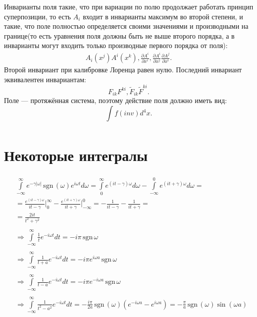 \documentclass[a4paper,14pt]{extreport} %
\newcommand{\dff}[2]{\frac{\partial #1}{\partial #2}}
\newcommand{\sign}{\mathrm{\,sgn}\,}
\begin{document}
	 Инварианты поля такие, что при вариации по полю продолжает работать принцип суперпозиции, то есть $A_i$ входит в инварианты максимум во второй степени, и такие, что поле полностью определяется своими значениями и производными на границе(то есть уравнения поля должны быть не выше второго порядка, а в инварианты могут входить только производные первого порядка от поля):
	 \begin{gather*}
	 A_i(x^j) A^i(x^k), \dff{A^i}{x^i}, \dff{A^i}{x^j} \dff{A^j}{x^i}.
	 \end{gather*}
	 Второй инвариант при калибровке Лоренца равен нулю. Последний инвариант эквивалентен инвариантам:
	 \[	
	 	F_{ik}F^{ki}, \tilde{F}_{ik} \tilde{F}^{ki}.
	 \]
	 Поле --- протяжённая система, поэтому действие поля должно иметь вид:
	 \[
	 \int\limits_{} f(inv) d^4 x.
	 \]
	 
\appendix

\section{Некоторые интегралы}\label{ap_int}

\begin{align*}
	&
	\begin{gathered}
	\int\limits_{-\infty}^\infty e^{-\gamma |\omega|} \sign (\omega) e^{i\omega t} d \omega = 
	\int\limits_{0}^\infty e^{(i t - \gamma) \omega} d \omega - 
	\int\limits_{-\infty}^0 e^{(i t + \gamma) \omega} d \omega =
	\\
	=
	\frac{e^{(i t -\gamma) \omega}}{i t - \gamma} \Bigg|_0^\infty -
	\frac{e^{(i t + \gamma) \omega}}{i t + \gamma} \Bigg|_{-\infty}^0 =
	-\frac{1}{i t - \gamma} - \frac{1}{i t + \gamma} = 
	\\ 
	=
	\frac{2 i t}{t^2 + \gamma^2}
	\end{gathered}
	\\ &
	\begin{gathered}
		\Rightarrow \int\limits_{-\infty}^\infty \frac{1}{t}  e^{-i\omega t} dt = - i\pi \sign \omega
	\end{gathered}
	\\ &
	\begin{gathered}
		\Rightarrow \int\limits_{-\infty}^\infty \frac{1}{t+a}  e^{-i\omega t} dt = - i \pi e^{i \omega a} \sign \omega
	\end{gathered}
	\\ &
	\begin{gathered}
		\Rightarrow \int\limits_{-\infty}^\infty \frac{1}{t-a}  e^{-i\omega t} dt = - i \pi e^{-i \omega a} \sign \omega
	\end{gathered}
	\\ &
	\begin{gathered}
		\Rightarrow \int\limits_{-\infty}^\infty \frac{1}{t^2 - a^2}  e^{-i\omega t} dt = - \frac{i \pi}{2a} \sign (\omega) \left(e^{-i \omega a} - e^{i \omega a}\right) =
		-\frac{\pi}{a} \sign (\omega) \sin(\omega a)
	\end{gathered}	
\end{align*}
	
\end{document}
